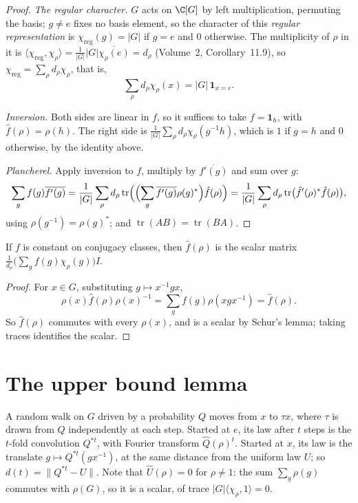 \begin{proof}
\emph{The regular character.} $G$ acts on $\C[G]$ by left multiplication, permuting the basis; $g\ne e$ fixes no basis element, so the character of this \emph{regular representation} is $\chi_{\mathrm{reg}}(g)=|G|$ if $g=e$ and $0$ otherwise. The multiplicity of
$\rho$ in it is $\langle\chi_{\mathrm{reg}},\chi_\rho\rangle=\frac1{|G|}|G|\overline{\chi_\rho(e)}=d_\rho$ (Volume~2, Corollary~11.9), so $\chi_{\mathrm{reg}}=\sum_\rho d_\rho\chi_\rho$, that is,
\[
\sum_{\rho}d_\rho\chi_\rho(x)=|G|\,\mathbf 1_{x=e}.
\]

\emph{Inversion.} Both sides are linear in $f$, so it suffices to take $f=\mathbf 1_h$, with $\hat f(\rho)=\rho(h)$. The right side is $\frac1{|G|}\sum_\rho d_\rho\chi_\rho(g^{-1}h)$, which is $1$ if $g=h$ and $0$ otherwise, by the identity above.

\emph{Plancherel.} Apply inversion to $f$, multiply by $\overline{f'(g)}$ and sum over $g$:
\[
\sum_gf(g)\overline{f'(g)}=\frac1{|G|}\sum_\rho d_\rho\operatorname{tr}\Bigl(\Bigl(\sum_g\overline{f'(g)}\rho(g)^*\Bigr)\hat f(\rho)\Bigr)=\frac1{|G|}\sum_\rho d_\rho\operatorname{tr}\bigl(\hat f'(\rho)^*\hat f(\rho)\bigr),
\]
using $\rho(g^{-1})=\rho(g)^*$; and $\operatorname{tr}(AB)=\operatorname{tr}(BA)$.
\end{proof}

\begin{proposition}\label{prop:classfourier}
If $f$ is constant on conjugacy classes, then $\hat f(\rho)$ is the scalar matrix $\frac1{d_\rho}\bigl(\sum_gf(g)\chi_\rho(g)\bigr)I$.
\end{proposition}

\begin{proof}
For $x\in G$, substituting $g\mapsto x^{-1}gx$,
\[
\rho(x)\hat f(\rho)\rho(x)^{-1}=\sum_gf(g)\rho(xgx^{-1})=\hat f(\rho).
\] So $\hat f(\rho)$ commutes with every $\rho(x)$, and is a scalar by Schur's lemma; taking traces identifies the scalar.
\end{proof}

\section{The upper bound lemma}

A random walk on $G$ driven by a probability $Q$ moves from $x$ to $\tau x$, where $\tau$ is drawn from $Q$ independently at each step. Started at $e$, its law after $t$ steps is the $t$-fold convolution $Q^{*t}$, with Fourier transform $\hat Q(\rho)^t$. Started at $x$, its law is the
translate $g\mapsto Q^{*t}(gx^{-1})$, at the same distance from the uniform law $U$; so $d(t)=\|Q^{*t}-U\|$. Note that $\hat U(\rho)=0$ for $\rho\ne1$: the sum $\sum_g\rho(g)$ commutes with $\rho(G)$, so it is a scalar, of trace $|G|\langle\chi_\rho,1\rangle=0$.

